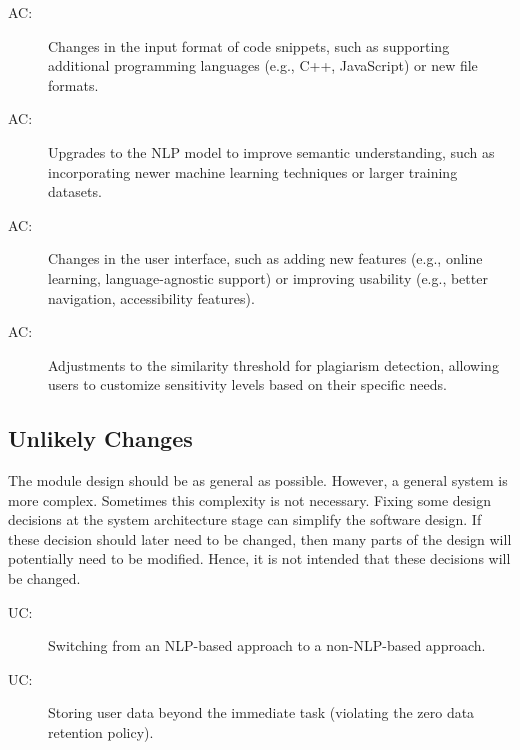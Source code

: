 \documentclass[12pt, titlepage]{article}
\newcounter{acnum}
\newcommand{\actheacnum}{AC\theacnum}
\newcounter{ucnum}
\newcommand{\uctheucnum}{UC\theucnum}
\begin{document}
\begin{description}
\item[ \actheacnum \label{acInput}:] Changes in the input format of code snippets, such as supporting additional programming languages (e.g., C++, JavaScript) or new file formats.
\item[ \actheacnum \label{acNLP}:] Upgrades to the NLP model to improve semantic understanding, such as incorporating newer machine learning techniques or larger training datasets.
\item[ \actheacnum \label{acUI}:] Changes in the user interface, such as adding new features (e.g., online learning, language-agnostic support) or improving usability (e.g., better navigation, accessibility features).
\item[ \actheacnum \label{acThreshold}:] Adjustments to the similarity threshold for plagiarism detection, allowing users to customize sensitivity levels based on their specific needs.
\end{description}


\subsection{Unlikely Changes} \label{SecUchange}

The module design should be as general as possible. However, a general system is
more complex. Sometimes this complexity is not necessary. Fixing some design
decisions at the system architecture stage can simplify the software design. If
these decision should later need to be changed, then many parts of the design
will potentially need to be modified. Hence, it is not intended that these
decisions will be changed.

\begin{description}
  \item[ \uctheucnum \label{ucNLP}:] Switching from an NLP-based approach to a non-NLP-based approach.
  \item[ \uctheucnum \label{ucDataRetention}:] Storing user data beyond the immediate task (violating the zero data retention policy).
\end{description}
\end{document}
